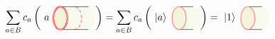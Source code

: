 \begin{equation}
  \sum_{a\in B}  c_a  \left(  ~  a  ~
    \begin{tikzpicture}[xscale=0.25, yscale=0.4, baseline=(x.base)]
        \node (x) at (0,0) {\vphantom{x}};
        \def\cylinderlength{4cm}

        \fill[color=olive!5] (0,-1) arc (-90:90:1) -- ++(\cylinderlength,0) arc (90:-90:1) -- ++(-\cylinderlength,0) -- cycle;

        \draw[color=red!50, densely dashed, thick] (\cylinderlength/2,-1) arc (-90:90:1);
        \draw[color=red!50, densely dotted] (\cylinderlength/2,1) arc (90:270:1);

        \draw (0,1) -- (\cylinderlength,1);
        \draw (0,-1) -- (\cylinderlength,-1);

        \filldraw[color=red, double, fill=olive!10] (0,0) circle[radius=1];

    \end{tikzpicture}
  \right)
  =
  \sum_{a\in B}  c_a  \left(  ~  \left|a\right\rangle  ~
    \begin{tikzpicture}[xscale=0.25, yscale=0.4, baseline=(x.base)]
        \node (x) at (0,0) {\vphantom{x}};
        \def\cylinderlength{2cm}

        \fill[color=olive!5] (0,-1) arc (-90:90:1) -- ++(\cylinderlength,0) arc (90:-90:1) -- ++(-\cylinderlength,0) -- cycle;

        \draw (0,1) -- (\cylinderlength,1);
        \draw (0,-1) -- (\cylinderlength,-1);


        \filldraw[color=red!50, thick, fill=olive!10] (0,0) circle[radius=1];

    \end{tikzpicture}
  \right)
    =  ~
    \left|1\right\rangle  ~
      \begin{tikzpicture}[xscale=0.25, yscale=0.4, baseline=(x.base)]
        \node (x) at (0,0) {\vphantom{x}};
        \def\cylinderlength{2cm}

        \fill[color=olive!5] (0,-1) arc (-90:90:1) -- ++(\cylinderlength,0) arc (90:-90:1) -- ++(-\cylinderlength,0) -- cycle;

        \draw (0,1) -- (\cylinderlength,1);
        \draw (0,-1) -- (\cylinderlength,-1);
        \filldraw[color=red!50, thick, fill=olive!10] (0,0) circle[radius=1];


\end{tikzpicture}
\end{equation}
